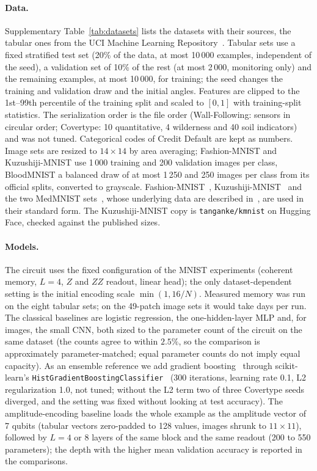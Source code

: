 \documentclass[11pt]{article}
\begin{document}
\paragraph{Data.}
Supplementary Table~\ref{tab:datasets} lists the datasets with their sources, the tabular ones from the UCI Machine Learning Repository~\cite{uci}. Tabular sets use a fixed stratified test set (20\% of the data, at most 10\,000 examples, independent of the seed), a validation set of 10\% of the rest (at most 2\,000, monitoring only) and the remaining examples, at most 10\,000, for training; the seed changes the training and validation draw and the initial angles. Features are clipped to the 1st--99th percentile of the training split and scaled to $[0,1]$ with training-split statistics. The serialization order is the file order (Wall-Following: sensors in circular order; Covertype: 10 quantitative, 4 wilderness and 40 soil indicators) and was not tuned. Categorical codes of Credit Default are kept as numbers. Image sets are resized to $14\times14$ by area averaging; Fashion-MNIST and Kuzushiji-MNIST use 1\,000 training and 200 validation images per class, BloodMNIST a balanced draw of at most 1\,250 and 250 images per class from its official splits, converted to grayscale. Fashion-MNIST~\cite{xiao2017fashion}, Kuzushiji-MNIST~\cite{clanuwat2018kmnist} and the two MedMNIST sets~\cite{yang2023medmnist}, whose underlying data are described in~\cite{acevedo2020blood,kermany2018pneumonia}, are used in their standard form. The Kuzushiji-MNIST copy is \texttt{tanganke/kmnist} on Hugging Face, checked against the published sizes.

\paragraph{Models.}
The circuit uses the fixed configuration of the MNIST experiments (coherent memory, $L=4$, $Z$ and $ZZ$ readout, linear head); the only dataset-dependent setting is the initial encoding scale $\min(1,16/N)$. Measured memory was run on the eight tabular sets; on the 49-patch image sets it would take days per run. The classical baselines are logistic regression, the one-hidden-layer MLP and, for images, the small CNN, both sized to the parameter count of the circuit on the same dataset (the counts agree to within $2.5\%$, so the comparison is approximately parameter-matched; equal parameter counts do not imply equal capacity). As an ensemble reference we add gradient boosting~\cite{friedman2001boosting} through scikit-learn's \texttt{HistGradientBoostingClassifier}~\cite{pedregosa2011sklearn} (300 iterations, learning rate 0.1, L2 regularization 1.0, not tuned; without the L2 term two of three Covertype seeds diverged, and the setting was fixed without looking at test accuracy). The amplitude-encoding baseline loads the whole example as the amplitude vector of 7 qubits (tabular vectors zero-padded to 128 values, images shrunk to $11\times11$), followed by $L=4$ or $8$ layers of the same block and the same readout (200 to 550 parameters); the depth with the higher mean validation accuracy is reported in the comparisons.
\end{document}
